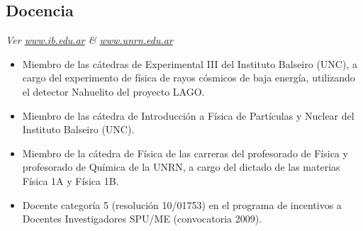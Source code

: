 \subsection*{Docencia}
{\small{\textit{Ver \href{http://www.ib.edu.ar}{www.ib.edu.ar} \& \href{http://www.unrn.edu.ar}{www.unrn.edu.ar}}}}
\begin{itemize}
\item Miembro de las cátedras de Experimental III del Instituto Balseiro (UNC), a cargo del experimento de física de rayos cósmicos de baja energía, utilizando el detector Nahuelito del proyecto LAGO.
\item Miembro de las cátedra de Introducción a Física de Partículas y Nuclear del Instituto Balseiro (UNC).
\item Miembro de la cátedra de Física de las carreras del profesorado de Física y profesorado de Química de la UNRN, a cargo del dictado de las materias Física 1A y Física 1B.
\item Docente categoría 5 (resolución 10/01753) en el programa de incentivos a Docentes Investigadores SPU/ME (convocatoria 2009).
\end{itemize}
\fi
